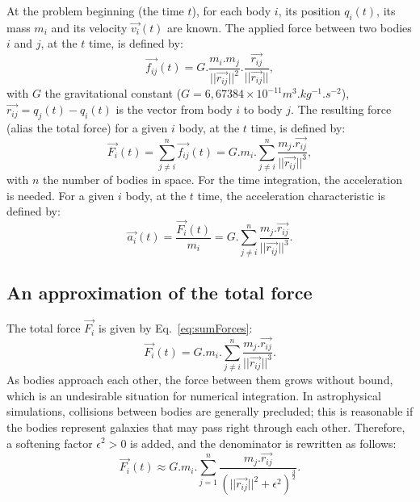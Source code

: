 At the problem beginning (the time $t$), for each body $i$, its position $q_{i}(t)$, its mass $m_i$ and its velocity $\vec{v_i}(t)$ are known.
The applied force between two bodies $i$ and $j$, at the $t$ time, is defined by:
\begin{equation}
\label{eq:force}
	\vec{f_{ij}}(t) = G.\frac{m_i.m_j}{||\vec{r_{ij}}||^2}.\frac{\vec{r_{ij}}}{||\vec{r_{ij}}||},
\end{equation}
with $G$ the gravitational constant ($G = 6,67384\times10^{-11} m^3.kg^{-1}.s^{-2}$), $\vec{r_{ij}} = q_j(t) - q_i(t)$ is the vector from body $i$ to body $j$.
The resulting force (alias the total force) for a given $i$ body, at the $t$ time, is defined by:
\begin{equation}
\label{eq:sumForces}
	\vec{F_i}(t) = \sum_{j \ne i}^{n} \vec{f_{ij}}(t) = G.m_i.\sum_{j \ne i}^{n}\frac{m_j.\vec{r_{ij}}}{||\vec{r_{ij}}||^3},
\end{equation}
with $n$ the number of bodies in space.
For the time integration, the acceleration is needed. For a given $i$ body, at the $t$ time, the acceleration characteristic is defined by:
\begin{equation}
\label{eq:acceleration}
	\vec{a_i}(t) = \frac{\vec{F_i}(t)}{m_i} = G.\sum_{j \ne i}^{n}\frac{m_j.\vec{r_{ij}}}{||\vec{r_{ij}}||^3}.
\end{equation}

\subsection{An approximation of the total force}

The total force $\vec{F_i}$ is given by Eq.~\ref{eq:sumForces}:
\begin{equation*}
	\vec{F_i}(t) = G.m_i.\sum_{j \ne i}^{n}\frac{m_j.\vec{r_{ij}}}{||\vec{r_{ij}}||^3}.
\end{equation*}
As bodies approach each other, the force between them grows without bound, which is an undesirable situation for numerical integration. 
In astrophysical simulations, collisions between bodies are generally precluded; this is reasonable if the bodies represent galaxies that may pass right through each other. 
Therefore, a softening factor $\epsilon^2 > 0$ is added, and the denominator is rewritten as follows:
\begin{equation}
\label{eq:sumForcesSoft}
	\vec{F_i}(t) \approx G.m_i.\sum_{j = 1}^{n}\frac{m_j.\vec{r_{ij}}}{(||\vec{r_{ij}}||^2 + \epsilon^2)^\frac{3}{2}}.
\end{equation}

